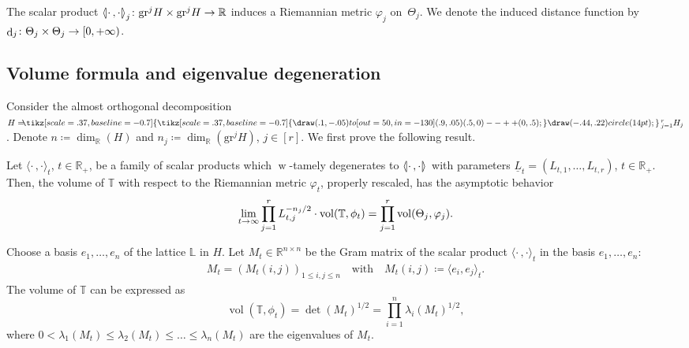\documentclass[AHL,Unicode,longabstracts]{cedram}
\newcommand{\symbuptm}{\tikz[scale=.37, baseline=-0.7]{\draw(.1,-.05)to[out=50,in=-130](.9,.05) (.5,0)--++(0,.5);}}
\newcommand{\almorth}{\tikz[scale=.37, baseline=-0.7]{\symbuptm \draw (-.44,.22) circle (14pt);}}
\newcommand{\aplus}{\hspace{-.2cm}\almorth\,}
\newcommand{\innone}[2]{{\langle#2\rangle_{#1}}}
\newcommand{\llangle}{\mathopen{\langle\mkern -3.1mu\lvert}}
\newcommand{\rrangle}{\mathclose{\rvert\mkern -3.1mu\rangle}}
\newcommand{\highinn}[2]{{\llangle#2\rrangle_{#1}}}
\DeclareMathOperator{\weak}{w}
\DeclareMathOperator{\vol}{vol}
\DeclareMathOperator{\dist}{d}
\newcommand{\R}{\mathbb{R}}
\newcommand{\T}{\mathbb{T}}
\renewcommand{\L}{\mathbb{L}}
\newcommand{\grm}[2]{\mathrm{gr}_{#1}^{#2}}
\renewcommand*{\to}{\mathchoice{\longrightarrow}{\rightarrow}{\rightarrow}{\rightarrow}}
\begin{document}
The scalar product $\highinn{j}{\cdot\,,\cdot}\colon \grm{}{j}H \times\grm{}{j} H \to \R$ induces a Riemannian metric $\varphi_j$ on~$\Theta_j$. We denote the induced distance function by $\dist_j \colon \Theta_j \times \Theta_j \to [0, +\infty)$.



\subsection{Volume formula and eigenvalue degeneration}

Consider the almost orthogonal decomposition $H= \aplus_{j=1}^r H_j$. Denote $n \coloneq \dim_\R(H)$ and $n_j \coloneq \dim_\R(\grm{}{j} H)$, $ j \in [r]$. We first prove the following result.

\begin{theo} \label{thm:volume_degeneration}
Let $\innone{t}{\cdot\,, \cdot}$, $t \in \R_+$, be a family of scalar products which $\weak$-tamely degenerates to $\highinn{}{\cdot\,, \cdot}$ with parameters $\underline L_t =(L_{t,1}, \dots, L_{t,r})$, $t \in \R_+$. Then, the volume of $\T$ with respect to the Riemannian metric $\varphi_t$, properly rescaled, has the asymptotic behavior
\[
\lim_{t \to \infty} \prod_{j=1}^r L_{t,j}^{-n_j/2} \cdot \vol(\T, \phi_t) = \prod_{j=1}^r \vol (\Theta_{j}, \varphi_j).
\]
\end{theo}
Choose a basis $e_1, \dots, e_n$ of the lattice $\L$ in $H$. Let $M_t \in \R^{n \times n}$ be the Gram matrix of the scalar product $\innone{t}{\cdot\,,\cdot}$ in the basis $e_1, \dots, e_n$:
\begin{align*}
M_t = (M_t(i,j))_{1 \le i,j \le n} \quad \text{with} \quad M_t(i,j) \coloneqq \innone{t}{e_i, e_j}.
\end{align*}
The volume of $\T$ can be expressed as
\begin{equation}\label{eq:torus_volume_matrix}
\vol(\T, \phi_t) = \det(M_t)^{1/2} = \prod_{i=1}^n \lambda_i(M_t)^{1/2},
\end{equation}
where $0 < \lambda_1(M_t) \le \lambda_2(M_t) \le \dots \le \lambda_n(M_t)$ are the eigenvalues of $M_t$.
\end{document}
